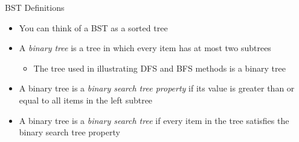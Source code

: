 \documentclass[
  ignorenonframetext,
]{beamer}
\providecommand{\tightlist}{%
  \setlength{\itemsep}{0pt}\setlength{\parskip}{0pt}}\usepackage{longtable,booktabs,array}
\begin{document}
\begin{frame}{BST Definitions}
\protect\hypertarget{bst-definitions}{}
\begin{itemize}
\item
  You can think of a BST as a sorted tree
\item
  A \emph{binary tree} is a tree in which every item has at most two
  subtrees

  \begin{itemize}
  \tightlist
  \item
    The tree used in illustrating DFS and BFS methods is a binary tree
  \end{itemize}
\item
  A binary tree is a \emph{binary search tree property} if its value is
  greater than or equal to all items in the left subtree
\item
  A binary tree is a \emph{binary search tree} if every item in the tree
  satisfies the binary search tree property
\end{itemize}
\end{frame}
\end{document}
